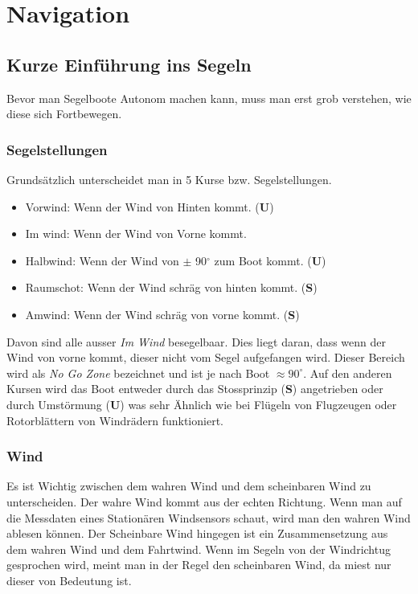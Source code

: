 
\chapter{Navigation}
\label{chap:autonomie}


\section{Kurze Einführung ins Segeln}
Bevor man Segelboote Autonom machen kann, muss man erst grob verstehen, wie diese sich Fortbewegen. 
\subsection{Segelstellungen}
Grundsätzlich unterscheidet man in 5 Kurse bzw. Segelstellungen.
\begin{itemize}
    \item Vorwind: Wenn der Wind von Hinten kommt. (\textbf{U})
    \item Im wind: Wenn der Wind von Vorne kommt.
    \item Halbwind: Wenn der Wind von $\pm$ 90$^{\circ}$ zum Boot kommt. (\textbf{U})
    \item Raumschot: Wenn der Wind schräg von hinten kommt. (\textbf{S})
    \item Amwind: Wenn der Wind schräg von vorne kommt. (\textbf{S})
\end{itemize}
Davon sind alle ausser \textit{Im Wind} besegelbaar. Dies liegt daran, dass wenn der Wind von vorne kommt, dieser nicht vom Segel aufgefangen wird. Dieser Bereich wird als \textit{No Go Zone} bezeichnet und ist je nach Boot $\approx 90^{\circ}$. Auf den anderen Kursen wird das Boot entweder durch das Stossprinzip (\textbf{S}) angetrieben oder durch Umstörmung (\textbf{U}) was sehr Ähnlich wie bei Flügeln von Flugzeugen oder Rotorblättern von Windrädern funktioniert.  
\subsection{Wind}
Es ist Wichtig zwischen dem wahren Wind und dem scheinbaren Wind zu unterscheiden. Der wahre Wind kommt aus der echten Richtung. Wenn man auf die Messdaten eines Stationären Windsensors schaut, wird man den wahren Wind ablesen können. Der Scheinbare Wind hingegen ist ein Zusammensetzung aus dem wahren Wind und dem Fahrtwind. Wenn im Segeln von der Windrichtug gesprochen wird, meint man in der Regel den scheinbaren Wind, da miest nur dieser von Bedeutung ist. 

